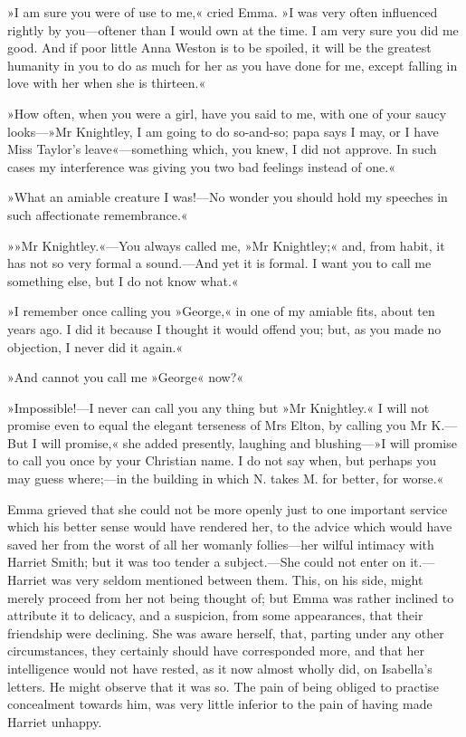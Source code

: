 »I am sure you were of use to me,« cried Emma. »I was very often influenced rightly by you—oftener than I would own at the time. I am very sure you did me good. And if poor little Anna Weston is to be spoiled, it will be the greatest humanity in you to do as much for her as you have done for me, except falling in love with her when she is thirteen.«

»How often, when you were a girl, have you said to me, with one of your saucy looks—»Mr Knightley, I am going to do so-and-so; papa says I may, or I have Miss Taylor's leave«—something which, you knew, I did not approve. In such cases my interference was giving you two bad feelings instead of one.«

»What an amiable creature I was!—No wonder you should hold my speeches in such affectionate remembrance.«

»»Mr Knightley.«—You always called me, »Mr Knightley;« and, from habit, it has not so very formal a sound.—And yet it is formal. I want you to call me something else, but I do not know what.«

»I remember once calling you »George,« in one of my amiable fits, about ten years ago. I did it because I thought it would offend you; but, as you made no objection, I never did it again.«

»And cannot you call me »George« now?«

»Impossible!—I never can call you any thing but »Mr Knightley.« I will not promise even to equal the elegant terseness of Mrs Elton, by calling you Mr K.—But I will promise,« she added presently, laughing and blushing—»I will promise to call you once by your Christian name. I do not say when, but perhaps you may guess where;—in the building in which N. takes M. for better, for worse.«

Emma grieved that she could not be more openly just to one important service which his better sense would have rendered her, to the advice which would have saved her from the worst of all her womanly follies—her wilful intimacy with Harriet Smith; but it was too tender a subject.—She could not enter on it.—Harriet was very seldom mentioned between them. This, on his side, might merely proceed from her not being thought of; but Emma was rather inclined to attribute it to delicacy, and a suspicion, from some appearances, that their friendship were declining. She was aware herself, that, parting under any other circumstances, they certainly should have corresponded more, and that her intelligence would not have rested, as it now almost wholly did, on Isabella's letters. He might observe that it was so. The pain of being obliged to practise concealment towards him, was very little inferior to the pain of having made Harriet unhappy.

